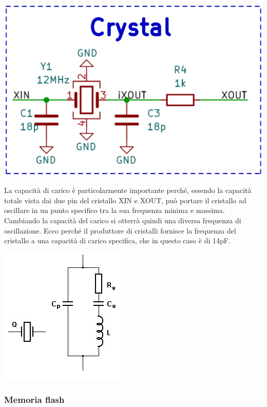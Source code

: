 \begin{center}
\includegraphics[scale=0.2]{figures/image76.png}
\captionsetup{type=figure}
\end{center}

\noindent La capacità di carico è particolarmente importante perché, essendo la
capacità totale vista dai due pin del cristallo XIN e XOUT, può portare
il cristallo ad oscillare in un punto specifico tra la sua frequenza
minima e massima. Cambiando la capacità del carico si otterrà quindi una
diversa frequenza di oscillazione. Ecco perché il produttore di
cristalli fornisce la frequenza del cristallo a una capacità di carico
specifica, che in questo caso è di 14pF.

\begin{center}
\includegraphics[scale=0.75]{figures/image28.png}
\captionsetup{type=figure}
\end{center}

\hypertarget{memoria-flash}{%
\subsubsection{\texorpdfstring{\hfill\break
Memoria flash}{ Memoria flash}}\label{memoria-flash}}

